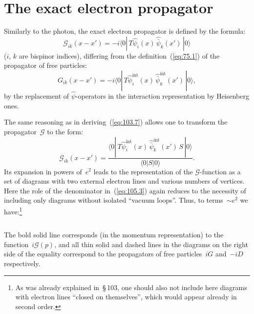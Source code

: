 
\section{The exact electron propagator}


Similarly to the photon, the exact electron propagator is defined by the formula:
\begin{equation}
\mathcal{G}_{ik}(x - x') = -i\langle 0|\,T\hat{\psi}_i(x)\,\hat{\bar{\psi}}_k(x')\,|0\rangle
\label{eq:105.1}
\end{equation}
($i$, $k$ are bispinor indices), differing from the definition~(\ref{eq:75.1}) of the propagator of free particles:
\begin{equation}
G_{ik}(x - x') = -i\langle 0|\,T\hat{\psi}^{\mathrm{int}}_i(x)\,\hat{\bar{\psi}}^{\mathrm{int}}_k(x')\,|0\rangle,
\label{eq:105.2}
\end{equation}
by the replacement of $\hat{\psi}$-operators in the interaction representation by Heisenberg ones.

The same reasoning as in deriving~(\ref{eq:103.7}) allows one to transform the propagator~$\mathcal{G}$ to the form:
\begin{equation}
\mathcal{G}_{ik}(x - x') = \frac{\langle 0|\,T\hat{\psi}^{\mathrm{int}}_i(x)\,\hat{\bar{\psi}}^{\mathrm{int}}_k(x')\,S\,|0\rangle}{\langle 0|S|0\rangle}.
\label{eq:105.3}
\end{equation}
Its expansion in powers of~$e^2$ leads to the representation of the $\mathcal{G}$-function as a set of diagrams with two external electron lines and various numbers of vertices. Here the role of the denominator in~(\ref{eq:105.3}) again reduces to the necessity of including only diagrams without isolated ``vacuum loops''. Thus, to terms~$\sim e^2$ we have:\footnote{As was already explained in~\S\,103, one should also not include here diagrams with electron lines ``closed on themselves'', which would appear already in second order.}

\begin{equation}
\label{eq:105.4}
\end{equation}

The bold solid line corresponds (in the momentum representation) to the function~$i\mathcal{G}(p)$, and all thin solid and dashed lines in the diagrams on the right side of the equality correspond to the propagators of free particles~$iG$ and~$-iD$ respectively.

